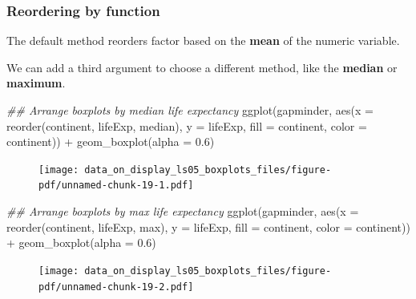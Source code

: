 \documentclass[
  letterpaper,
  DIV=11,
  numbers=noendperiod]{scrreprt}
\newenvironment{Shaded}{\begin{snugshade}}{\end{snugshade}}
\newcommand{\AttributeTok}[1]{\textcolor[rgb]{0.40,0.45,0.13}{#1}}
\newcommand{\DocumentationTok}[1]{\textcolor[rgb]{0.37,0.37,0.37}{\textit{#1}}}
\newcommand{\FloatTok}[1]{\textcolor[rgb]{0.68,0.00,0.00}{#1}}
\newcommand{\FunctionTok}[1]{\textcolor[rgb]{0.28,0.35,0.67}{#1}}
\newcommand{\NormalTok}[1]{\textcolor[rgb]{0.00,0.23,0.31}{#1}}
\newcommand{\SpecialCharTok}[1]{\textcolor[rgb]{0.37,0.37,0.37}{#1}}
\begin{document}
\hypertarget{reordering-by-function}{%
\subsubsection{Reordering by function}\label{reordering-by-function}}

The default method reorders factor based on the \textbf{mean} of the
numeric variable.

We can add a third argument to choose a different method, like the
\textbf{median} or \textbf{maximum}.

\begin{Shaded}
\begin{Highlighting}[]
\DocumentationTok{\#\# Arrange boxplots by median life expectancy}
\FunctionTok{ggplot}\NormalTok{(gapminder, }
       \FunctionTok{aes}\NormalTok{(}\AttributeTok{x =} \FunctionTok{reorder}\NormalTok{(continent, lifeExp, median),}
           \AttributeTok{y =}\NormalTok{ lifeExp, }
           \AttributeTok{fill =}\NormalTok{ continent,}
           \AttributeTok{color =}\NormalTok{ continent)) }\SpecialCharTok{+}
  \FunctionTok{geom\_boxplot}\NormalTok{(}\AttributeTok{alpha =} \FloatTok{0.6}\NormalTok{)}
\end{Highlighting}
\end{Shaded}

\begin{figure}[H]

{\centering \texttt{[image: data\_on\_display\_ls05\_boxplots\_files/figure-pdf/unnamed-chunk-19-1.pdf]}

}

\end{figure}

\begin{Shaded}
\begin{Highlighting}[]
\DocumentationTok{\#\# Arrange boxplots by max life expectancy}
\FunctionTok{ggplot}\NormalTok{(gapminder, }
       \FunctionTok{aes}\NormalTok{(}\AttributeTok{x =} \FunctionTok{reorder}\NormalTok{(continent, lifeExp, max),}
           \AttributeTok{y =}\NormalTok{ lifeExp, }
           \AttributeTok{fill =}\NormalTok{ continent,}
           \AttributeTok{color =}\NormalTok{ continent)) }\SpecialCharTok{+}
  \FunctionTok{geom\_boxplot}\NormalTok{(}\AttributeTok{alpha =} \FloatTok{0.6}\NormalTok{)}
\end{Highlighting}
\end{Shaded}

\begin{figure}[H]

{\centering \texttt{[image: data\_on\_display\_ls05\_boxplots\_files/figure-pdf/unnamed-chunk-19-2.pdf]}

}

\end{figure}
\end{document}
